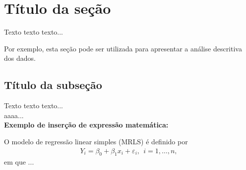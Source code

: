 \documentclass[12pt, a4paper, twoside]{article}
\numberwithin{equation}{subsection} %
\begin{document}
\section{Título da seção}\label{Sec2}

Texto texto texto...

Por exemplo, esta seção pode ser utilizada para apresentar a análise descritiva dos dados.

\subsection{Título da subseção}

Texto texto texto... \\

aaaa...\\

{ \bf Exemplo de inserção de expressão matemática:}

O modelo de regressão linear simples (MRLS) é definido por
\begin{eqnarray*}
Y_i = \beta_0 + \beta_1x_i + \varepsilon_i, \ \ i=1, \ldots, n,
\end{eqnarray*}
em que  ...

\end{document}
